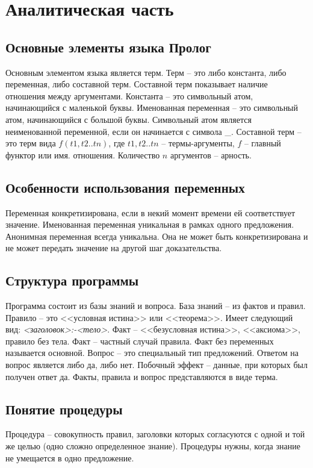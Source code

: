 \chapter{Аналитическая часть}

\section{Основные элементы языка Пролог}
Основным элементом языка является терм.
Терм -- это либо константа, либо переменная, либо составной терм. 
Составной терм показывает наличие отношения между аргументами. 
Константа -- это символьный атом, начинающийся с маленькой буквы. 
Именованная переменная -- это символьный атом, начинающийся с большой буквы. 
Символьный атом является неименованной переменной, если он начинается с символа \_. 
Составной терм -- это терм вида \(f(t1,t2..tn)\), где \(t1,t2..tn\) -- термы-аргументы, \(f\) -- главный функтор или имя. отношения. Количество \(n\) аргументов -- арность. 

\section{Особенности использования переменных}
Переменная конкретизирована, если в некий момент времени ей соответствует значение. Именованная переменная уникальная в рамках одного предложения. Анонимная переменная всегда уникальна. Она не может быть конкретизирована и не может передать значение на другой шаг доказательства.

\section{Структура программы}
Программа состоит из базы знаний и вопроса. База знаний -- из фактов и правил.
Правило -- это <<условная истина>> или <<теорема>>. Имеет следующий вид: \textit{<заголовок>:-<тело>}.
Факт -- <<безусловная истина>>, <<аксиома>>, правило без тела. Факт -- частный случай
правила.
Факт без переменных называется основной.
Вопрос -- это специальный тип предложений. Ответом на вопрос является либо да, либо нет. Побочный эффект -- данные, при которых был получен ответ да. 
Факты, правила и вопрос представляются в виде терма.

\section{Понятие процедуры}
Процедура -- совокупность правил, заголовки которых согласуются с одной и той же целью (одно сложно определенное знание). Процедуры нужны, когда знание не умещается в одно предложение.

